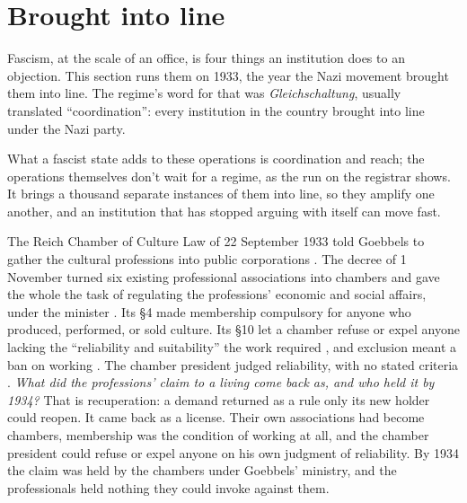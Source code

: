 \section{Brought into line}
\label{sec:3.2}
Fascism, at the scale of an office, is four things an institution does to an objection. This section runs them on 1933, the year the Nazi movement brought them into line. The regime's word for that was \emph{Gleichschaltung}, usually translated “coordination”: every institution in the country brought into line under the Nazi party.


What a fascist state adds to these operations is coordination and reach; the operations themselves don't wait for a regime, as the run on the registrar shows. It brings a thousand separate instances \autocite{deleuze1987plateaus} of them into line, so they amplify one another, and an institution that has stopped arguing with itself can move fast.


The Reich Chamber of Culture Law of 22 September 1933 told Goebbels to gather the cultural professions into public corporations \autocite{rkkg1933}. The decree of 1 November turned six existing professional associations into chambers and gave the whole the task of regulating the professions' economic and social affairs, under the minister \autocite[69]{dahm1986anfaenge}. Its \S4 made membership compulsory for anyone who produced, performed, or sold culture. Its \S10 let a chamber refuse or expel anyone lacking the “reliability and suitability” the work required \autocite{rkkdvo1933}, and exclusion meant a ban on working \autocite{hoor2015rkk}. The chamber president judged reliability, with no stated criteria \autocite[78]{dahm1986anfaenge}. \emph{What did the professions' claim to a living come back as, and who held it by 1934?} That is recuperation: a demand returned as a rule only its new holder could reopen. It came back as a license. Their own associations had become chambers, membership was the condition of working at all, and the chamber president could refuse or expel anyone on his own judgment of reliability. By 1934 the claim was held by the chambers under Goebbels' ministry, and the professionals held nothing they could invoke against them.

